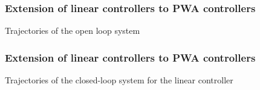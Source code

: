 \documentclass{beamer}
\begin{document}
  \frame
  {
    \frametitle{Extension of linear controllers to PWA controllers}
\centerline{}
\centerline{Trajectories of the open loop system}  
}

  \frame
  {
    \frametitle{Extension of linear controllers to PWA controllers}
\centerline{}
\centerline{Trajectories of the closed-loop system for the linear controller}
}
\end{document}
